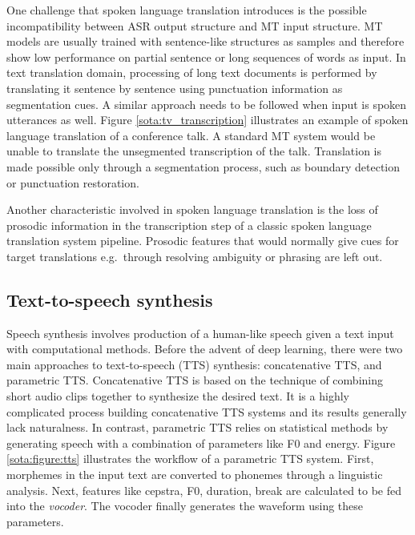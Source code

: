 One challenge that spoken language translation introduces is the possible incompatibility between ASR output structure and MT input structure. MT models are usually trained with sentence-like structures as samples and therefore show low performance on partial sentence or long sequences of words as input. In text translation domain, processing of long text documents is performed by translating it sentence by sentence using punctuation information as segmentation cues. A similar approach needs to be followed when input is spoken utterances as well. Figure \ref{sota:tv_transcription}  illustrates an example of spoken language translation of a conference talk. A standard MT system would be unable to translate the unsegmented transcription of the talk. Translation is made possible only through a segmentation process, such as boundary detection or punctuation restoration. 

Another characteristic involved in spoken language translation is the loss of prosodic information in the transcription step of a classic spoken language translation system pipeline. Prosodic features that would normally give cues for target translations e.g.~through resolving ambiguity or phrasing are left out. 


\subsection{Text-to-speech synthesis}
\label{sota:tts}


Speech synthesis involves production of a human-like speech given a text input with computational methods. Before the advent of deep learning, there were two main approaches to text-to-speech (TTS) synthesis: concatenative TTS, and parametric TTS. Concatenative TTS is based on the technique of combining short audio clips together to synthesize the desired text. It is a highly complicated process building concatenative TTS systems and its results generally lack naturalness. In contrast, parametric TTS relies on statistical methods by generating speech with a combination of parameters like F0 and energy. Figure \ref{sota:figure:tts} illustrates the workflow of a parametric TTS system. First, morphemes in the input text are converted to phonemes through a linguistic analysis. Next, features like cepstra, F0, duration, break are calculated to be fed into the \textit{vocoder}. The vocoder finally generates the waveform using these parameters.

